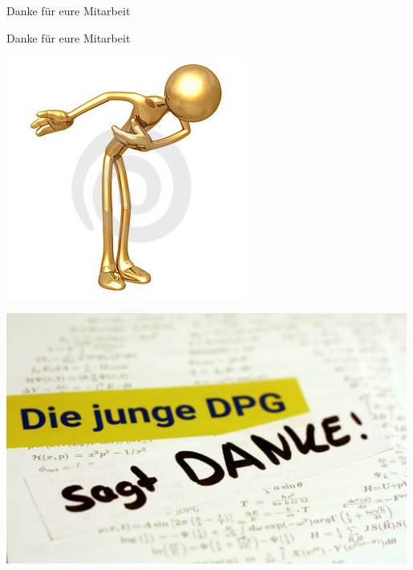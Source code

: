 \documentclass[
]{beamer}
\begin{document}
\begin{frame}{Danke für eure Mitarbeit}
  \begin{center}
    {\Large Danke für eure Mitarbeit}
  \end{center}
  \begin{minipage}[c]{0.35\textwidth}
    \includegraphics[]{figure/thank_you_1}
  \end{minipage}
  \hfill
  \begin{minipage}[c]{0.64\textwidth}
    \includegraphics[width=0.99\textwidth]{figure/20171206-Christina-Nolte-Merphi}
  \end{minipage}
\end{frame}
\end{document}
